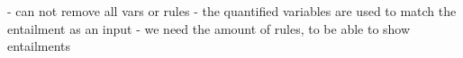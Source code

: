   


- can not remove all vars or rules
- the quantified variables are used to match the entailment as an input
- we need the amount of rules, to be able to show entailments


